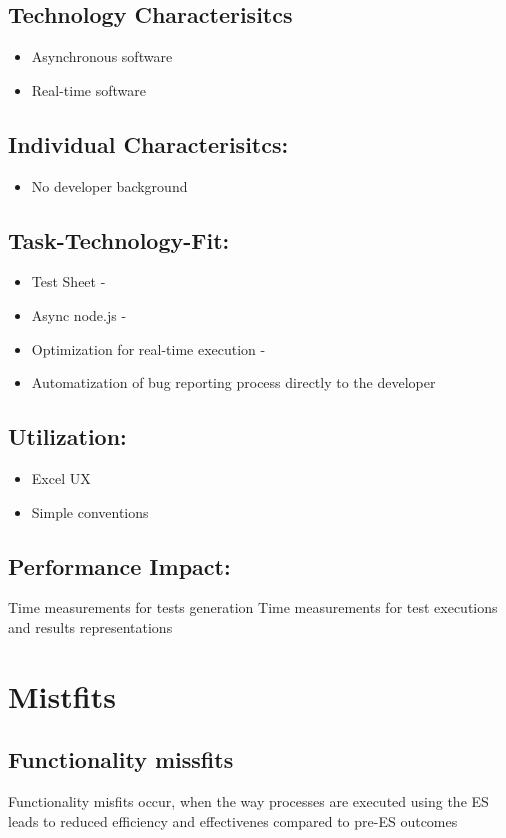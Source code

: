 \subsection{Technology Characterisitcs}
\begin{itemize}
	\item Asynchronous software
	\item	Real-time software
\end{itemize}

\subsection{Individual Characterisitcs:}
\begin{itemize}
 	\item  No developer background
\end{itemize}

\subsection{Task-Technology-Fit:}
\begin{itemize}
	\item Test Sheet - 
	\item Async node.js -
	\item Optimization for real-time execution - 
	\item Automatization of bug reporting process directly to the developer
\end{itemize}

\subsection{Utilization:}
\begin{itemize}
	\item Excel UX
	\item Simple conventions
\end{itemize}

\subsection{Performance Impact:}
Time measurements for tests generation
Time measurements for test executions and results representations

\section{Mistfits}
\subsection{Functionality missfits}
Functionality misfits occur, when the way processes are executed using the ES leads to reduced efficiency and effectivenes compared to pre-ES outcomes 

